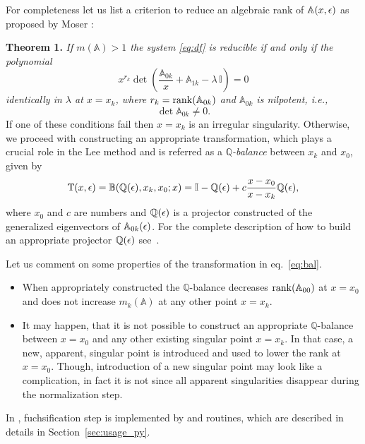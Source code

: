 \documentclass[12pt,a4paper]{article}
\def\M#1{\mathbb{#1}} %
\begin{document}
For completeness let us list a criterion to reduce an algebraic rank of $\M A(x,\eps)$ as proposed by Moser \cite{Mos59}:

\textbf{Theorem 1.}
{\em If $m(\M A) > 1$ the system \eqref{eq:df} is reducible if and only if the polynomial}
\begin{equation}
\label{eq:red_cond}
  x^{r_k} \det\left(\frac{\M A_{0k}}{x} + \M A_{1k} - \lambda \,\M I\right) = 0
\end{equation}
{\em identically in $\lambda$ at $x=x_k$, where $r_k=\rank(\M A_{0k})$ and $\M A_{0k}$ is nilpotent, i.e.,}
\begin{equation}
  \det \M A_{0k} \ne 0.
\end{equation}
If one of these conditions fail then $x=x_k$ is an irregular singularity.
Otherwise, we proceed with constructing an appropriate transformation, which plays a crucial role in the Lee method and is referred as a {\em $\M Q$-balance} between $x_k$ and $x_0$, given by
\begin{equation}
  \label{eq:bal}
  \M T(x,\eps) = \M B(\M Q(\eps), x_k, x_0; x) = \M I - \M Q(\eps) + c \frac{x-x_0}{x-x_k} \M Q(\eps),
\end{equation}
where $x_0$ and $c$ are numbers and $\M Q(\eps)$ is a projector constructed of the generalized eigenvectors of $\M A_{0k}(\eps)$.
For the complete description of how to build an appropriate projector $\M Q(\eps)$ see~\cite[p.~9]{Lee15}.

Let us comment on some properties of the transformation in eq.~\eqref{eq:bal}.
\begin{itemize}
  \item When appropriately constructed the $\M Q$-balance decreases $\rank(\M A_{00})$ at $x=x_0$ and does not increase $m_k(\M A)$ at any other point $x=x_k$.
  \item It may happen, that it is not possible to construct an appropriate $\M Q$-balance between $x=x_0$ and any other existing singular point $x=x_k$.
        In that case, a new, apparent, singular point is introduced and used to lower the rank at $x=x_0$.
        Though, introduction of a new singular point may look like a complication, in fact it is not since all apparent singularities disappear during the normalization step.
\end{itemize}

In \fuchsia, fuchsification step is implemented by  and  routines, which are described in details in Section~\ref{sec:usage_py}.
\end{document}
